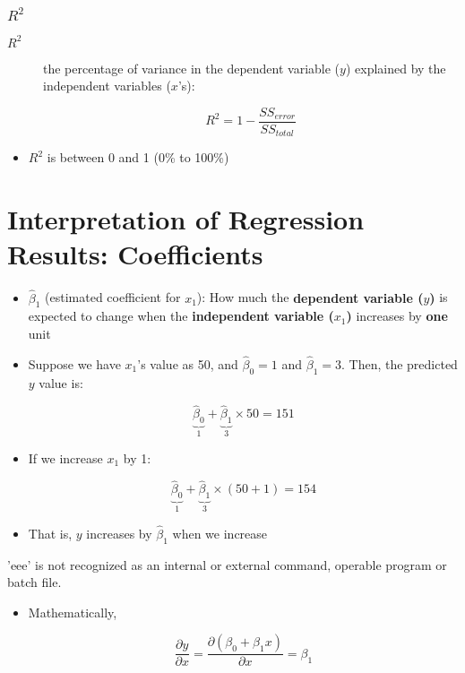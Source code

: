 \documentclass[10pt,article]{article}
\begin{document}
\subsubsection{\(R^2\)}
\label{sec:orgef26a00}

\begin{description}
\item[{\(R^2\)}] the percentage of variance in the dependent variable (\(y\))
explained by the independent variables (\(x\)'s):

\[ R^2 = 1 - \dfrac{SS_{error}}{SS_{total}} \]
\end{description}

\begin{itemize}
\item \(R^2\) is between 0 and 1 (0\% to 100\%)
\end{itemize}
\section{Interpretation of Regression Results: Coefficients}
\label{sec:org190c58d}

\begin{itemize}
\item \(\hat{\beta}_1\) (estimated coefficient for \(x_1\)): How much the
 {\bf dependent variable (\( y \))} is expected to change when the
 {\bf independent variable (\( x_{1} \))} increases by
 {\bf one} unit
\end{itemize}

\begin{itemize}
\item Suppose we have \(x_{1}\)'s value as 50, and \(\hat\beta_0 = 1\) and \(\hat\beta_1 = 3\). Then, the predicted \(y\) value is:

\[ \underbrace{\hat\beta_0}_{1} + \underbrace{\hat\beta_1}_{3} \times 50 = 151 \]

\item If we increase \(x_{1}\) by 1:

\[ \underbrace{\hat\beta_0}_{1} + \underbrace{\hat\beta_1}_{3} \times (50 + 1) = 154 \]

\item That is, \(y\) increases by \(\hat\beta_1\) when we increase
\end{itemize}
'eee' is not recognized as an internal or external command,
operable program or batch file.
\begin{itemize}
\item Mathematically,

\[  \dfrac{\partial y}{\partial x} = \dfrac{\partial ( \beta_0 + \beta_1 x)}{\partial x} = \beta_1 \]
\end{itemize}
\end{document}
